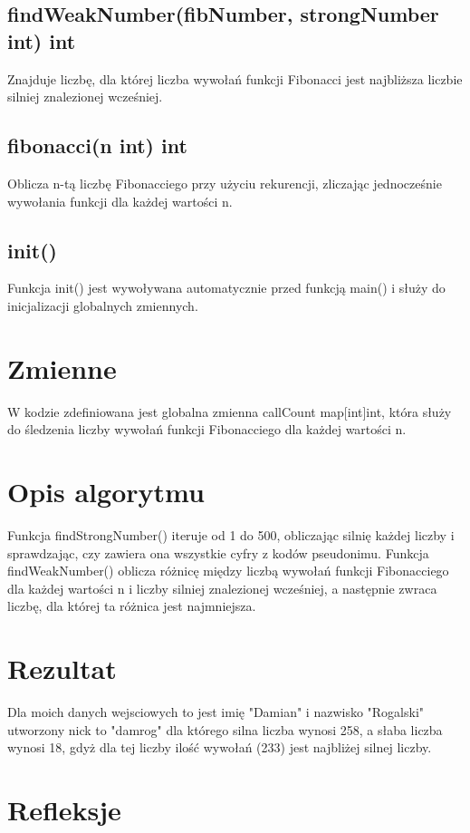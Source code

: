 \documentclass{article}
\begin{document}
\subsection{findWeakNumber(fibNumber, strongNumber int) int}
Znajduje liczbę, dla której liczba wywołań funkcji Fibonacci jest najbliższa liczbie silniej znalezionej wcześniej.

\subsection{fibonacci(n int) int}
Oblicza n-tą liczbę Fibonacciego przy użyciu rekurencji, zliczając jednocześnie wywołania funkcji dla każdej wartości n.

\subsection{init()}
Funkcja init() jest wywoływana automatycznie przed funkcją main() i służy do inicjalizacji globalnych zmiennych.

\section{Zmienne}
W kodzie zdefiniowana jest globalna zmienna callCount map[int]int, która służy do śledzenia liczby wywołań funkcji Fibonacciego dla każdej wartości n.

\section{Opis algorytmu}
Funkcja findStrongNumber() iteruje od 1 do 500, obliczając silnię każdej liczby i sprawdzając, czy zawiera ona wszystkie cyfry z kodów pseudonimu. 
Funkcja findWeakNumber() oblicza różnicę między liczbą wywołań funkcji Fibonacciego dla każdej wartości n i liczby silniej znalezionej wcześniej, a następnie zwraca liczbę, dla której ta różnica jest najmniejsza.

\section{Rezultat}
Dla moich danych wejsciowych to jest imię "Damian" i nazwisko "Rogalski" utworzony nick to "damrog" dla którego silna liczba wynosi 258, a słaba liczba wynosi 18, gdyż dla tej liczby ilość wywołań (233) jest najbliżej silnej liczby. 

\newpage
\section{Refleksje}
\end{document}
